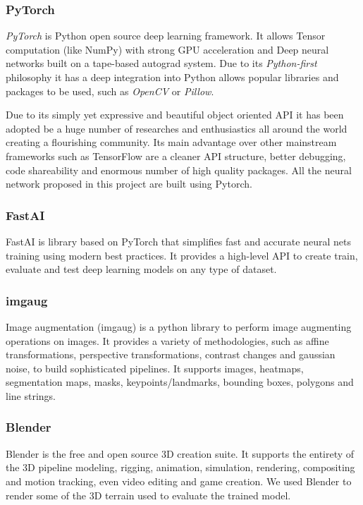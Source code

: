 \documentclass[../document.tex]{subfiles}
\begin{document}
\subsubsection{PyTorch}
\emph{PyTorch} is Python open source deep learning framework. It allows Tensor computation (like NumPy) with strong GPU acceleration and Deep neural networks built on a tape-based autograd system. Due to its \emph{Python-first} philosophy it has a deep integration into Python allows popular libraries and packages to be used, such as \emph{OpenCV} or \emph{Pillow}.  

Due to its simply yet expressive and beautiful object oriented API it has been adopted be a huge number of researches and enthusiastics all around the world creating a flourishing community. 
Its main advantage over other mainstream frameworks such as TensorFlow  are a cleaner API structure, better debugging, code shareability and enormous number of high quality packages. All the neural network proposed in this project are built using Pytorch.

\subsubsection{FastAI}
FastAI is  library based on PyTorch that simplifies fast and accurate neural nets training using modern best practices. It provides a high-level API to create train, evaluate and test deep learning models on any type of dataset.

\subsubsection{imgaug}
Image augmentation (imgaug) is a python library to perform image augmenting operations on images. It provides a variety of methodologies, such as affine transformations, perspective transformations, contrast changes and gaussian noise, to build sophisticated pipelines. It supports images,  heatmaps, segmentation maps, masks, keypoints/landmarks, bounding boxes, polygons and line strings.

\subsubsection{Blender}
Blender is the free and open source 3D creation suite. It supports the entirety of the 3D pipeline modeling, rigging, animation, simulation, rendering, compositing and motion tracking, even video editing and game creation. We used Blender to render some of the 3D terrain used to evaluate the trained model.
\end{document}
